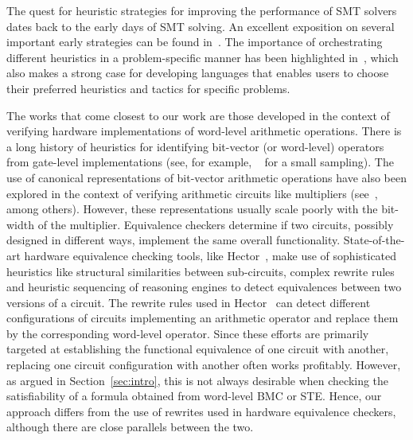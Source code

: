 The quest for heuristic strategies for improving the performance of
SMT solvers dates back to the early days of SMT solving.  An excellent
exposition on several important early strategies can be found
in~\cite{barrett}.  The importance of orchestrating different
heuristics in a problem-specific manner has been highlighted
in~\cite{deMoura2013}, which also makes a strong case for developing
languages that enables users to choose their preferred heuristics and
tactics for specific problems.

The works that come closest to our work are those developed in the
context of verifying hardware implementations of word-level arithmetic
operations.  There is a long history of heuristics for identifying
bit-vector (or word-level) operators from gate-level implementations
(see, for example,
~\cite{kunz,ciesielski,reveng,earlier-pat-match-synopsys} for a small
sampling).  The use of canonical representations of bit-vector
arithmetic operations have also been explored in the context of
verifying arithmetic circuits like multipliers
(see~\cite{bmd,drechsler}, among others).  However, these
representations usually scale poorly with the bit-width of the
multiplier.  Equivalence checkers determine if two circuits, possibly
designed in different ways, implement the same overall functionality.
State-of-the-art hardware equivalence checking tools, like
Hector~\cite{hector}, make use of sophisticated heuristics like
structural similarities between sub-circuits, complex rewrite rules
and heuristic sequencing of reasoning engines to detect equivalences
between two versions of a circuit.  The rewrite rules used in
Hector~\cite{kolbl} can detect different configurations of circuits
implementing an arithmetic operator and replace them by the
corresponding word-level operator.  Since these efforts are primarily
targeted at establishing the functional equivalence of one circuit
with another, replacing one circuit configuration with another often
works profitably.  However, as argued in Section~\ref{sec:intro}, this
is not always desirable when checking the satisfiability of a formula
obtained from word-level BMC or STE.  Hence, our approach
differs from the use of rewrites used in hardware equivalence
checkers, although there are close parallels between the two. %

